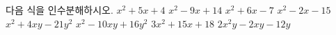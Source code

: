 다음 식을 인수분해하시오.
 $x^2+5x+4$
 $x^2-9x+14$
 $x^2+6x-7$
 $x^2-2x-15$
 $x^2+4xy-21y^2$
 $x^2-10xy+16y^2$
 $3x^2+15x+18$
 $2x^2y-2xy-12y$

